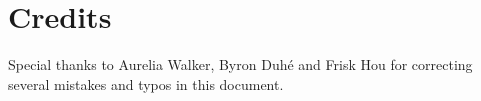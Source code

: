 \section{Credits}

Special thanks to Aurelia Walker, Byron Duh\'{e} and Frisk Hou for correcting several mistakes and typos in this document.
